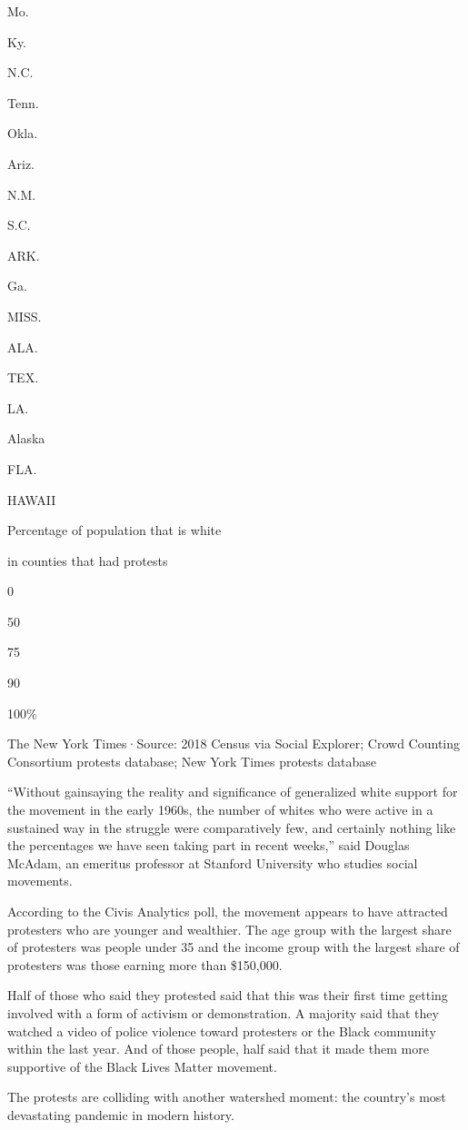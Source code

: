 Mo.

Ky.

N.C.

Tenn.

Okla.

Ariz.

N.M.

S.C.

ARK.

Ga.

MISS.

ALA.

TEX.

LA.

Alaska

FLA.

HAWAII

Percentage of population that is white

in counties that had protests

0

50

75

90

100\%

The New York Times·Source: 2018 Census via Social Explorer; Crowd
Counting Consortium protests database; New York Times protests database

``Without gainsaying the reality and significance of generalized white
support for the movement in the early 1960s, the number of whites who
were active in a sustained way in the struggle were comparatively few,
and certainly nothing like the percentages we have seen taking part in
recent weeks,'' said Douglas McAdam, an emeritus professor at Stanford
University who studies social movements.

According to the Civis Analytics poll, the movement appears to have
attracted protesters who are younger and wealthier. The age group with
the largest share of protesters was people under 35 and the income group
with the largest share of protesters was those earning more than
\$150,000.

Half of those who said they protested said that this was their first
time getting involved with a form of activism or demonstration. A
majority said that they watched a video of police violence toward
protesters or the Black community within the last year. And of those
people, half said that it made them more supportive of the Black Lives
Matter movement.

The protests are colliding with another watershed moment: the country's
most devastating pandemic in modern history.

